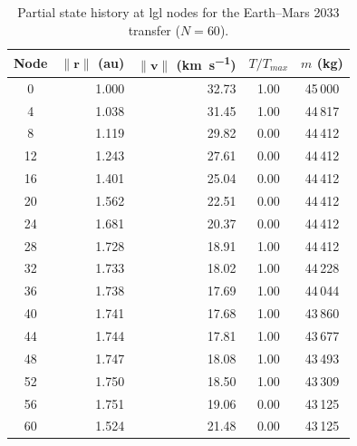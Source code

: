 \documentclass[dissertation, bookmarks]{../example/tex/grizz_thesis}
\begin{document}
\begin{table}[htbp]
  \caption{Partial state history at \gls{lgl} nodes for the Earth--Mars 2033 transfer ($N=60$).}
  \label{tab:appB-mars-states}
  \centering
  \begin{tabular}{crrcc}
    \toprule
    \textbf{Node} & $\|\mathbf{r}\|$ (\si{\astronomicalunit}) & $\|\mathbf{v}\|$ (\si{\kilo\meter\per\second}) & $T/T_{max}$ & $m$ (\si{\kilo\gram}) \\
    \midrule
     0  & 1.000 & 32.73 & 1.00 & 45\,000 \\
     4  & 1.038 & 31.45 & 1.00 & 44\,817 \\
     8  & 1.119 & 29.82 & 0.00 & 44\,412 \\
    12  & 1.243 & 27.61 & 0.00 & 44\,412 \\
    16  & 1.401 & 25.04 & 0.00 & 44\,412 \\
    20  & 1.562 & 22.51 & 0.00 & 44\,412 \\
    24  & 1.681 & 20.37 & 0.00 & 44\,412 \\
    28  & 1.728 & 18.91 & 1.00 & 44\,412 \\
    32  & 1.733 & 18.02 & 1.00 & 44\,228 \\
    36  & 1.738 & 17.69 & 1.00 & 44\,044 \\
    40  & 1.741 & 17.68 & 1.00 & 43\,860 \\
    44  & 1.744 & 17.81 & 1.00 & 43\,677 \\
    48  & 1.747 & 18.08 & 1.00 & 43\,493 \\
    52  & 1.750 & 18.50 & 1.00 & 43\,309 \\
    56  & 1.751 & 19.06 & 0.00 & 43\,125 \\
    60  & 1.524 & 21.48 & 0.00 & 43\,125 \\
    \bottomrule
  \end{tabular}
\end{table}

\blindtext


\PrintReferences
\end{document}
